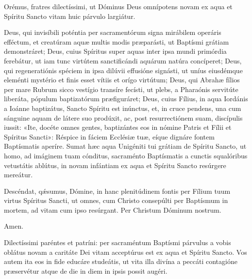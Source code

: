 
Orémus, fratres dilectíssimi, ut Dóminus Deus omnípotens novam ex aqua et
Spíritu Sancto vitam huic párvulo largiátur.


Deus,
qui invisíbili poténtia
per sacramentórum signa mirábilem operáris efféctum,
et creatúram aquæ multis modis præparásti,
ut Baptísmi grátiam demonstráret;
Deus, cuius Spíritus
super aquas inter ipsa mundi primórdia ferebátur,
ut iam tunc virtútem sanctificándi aquárum natúra concíperet;
Deus, qui regeneratiónis spéciem
in ipsa dilúvii effusióne signásti,
ut uníus eiusdémque eleménti mystério
et finis esset vítiis et orígo virtútum;
Deus, qui Abrahæ fílios
per mare Rubrum sicco vestígio transíre fecísti,
ut plebs, a Pharaónis servitúte liberáta,
pópulum baptizatórum præfiguráret;
Deus, cuius Fílius, in aqua Iordánis a Ioánne baptizátus,
Sancto Spíritu est inúnctus,
et, in cruce pendens,
una cum sánguine aquam de látere suo prodúxit,
ac, post resurrectiónem suam, discípulis iussit:
«Ite, docéte omnes gentes,
baptizántes eos in nómine Patris et Fílii et Spíritus Sancti»:
Réspice in fáciem Ecclésiæ tuæ,
eíque dignáre fontem Baptísmatis aperíre.
Sumat hæc aqua Unigéniti tui grátiam de Spíritu Sancto,
ut homo, ad imáginem tuam cónditus,
sacraménto Baptísmatis
a cunctis squalóribus vetustátis ablútus,
in novam infántiam
ex aqua et Spíritu Sancto resúrgere mereátur.


Descéndat, qǽsumus, Dómine,
in hanc plenitúdinem fontis
per Fílium tuum virtus Spíritus Sancti,
ut omnes, cum Christo consepúlti
per Baptísmum in mortem,
ad vitam cum ipso resúrgant.
Per Christum Dóminum nostrum.

 Amen.



Dilectíssimi paréntes et patríni: per sacraméntum Baptísmi párvulus a vobis
oblátus novam a caritáte Dei vitam acceptúrus est ex aqua et Spíritu Sancto. 
Vos autem ita eos in fide educáre studeátis, ut vita illa divína a peccáti
contagióne præservétur atque de die in diem in ipsis possit augéri.

